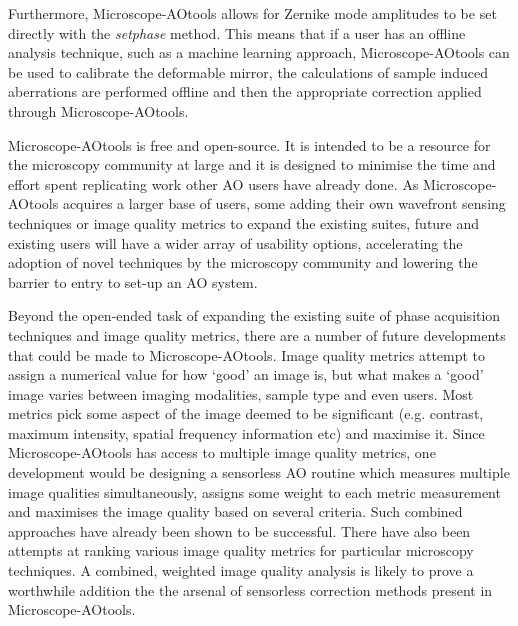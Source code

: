 Furthermore, Microscope-AOtools allows for Zernike mode amplitudes to be 
set directly with the \textit{set\textunderscore phase} method. This means 
that if a user has an offline analysis technique, such as a machine 
learning approach, Microscope-AOtools can be used to calibrate the 
deformable mirror, the calculations of sample induced aberrations are 
performed offline and then the appropriate correction applied through 
Microscope-AOtools.

Microscope-AOtools is free and open-source. It is intended to be a resource 
for the microscopy community at large and it is designed to minimise the 
time and effort spent replicating work other AO users have already done. As 
Microscope-AOtools acquires a larger base of users, some adding their own 
wavefront sensing techniques or image quality metrics to expand the 
existing suites, future and existing users will have a wider array of 
usability options, accelerating the adoption of novel techniques by the 
microscopy community and lowering the barrier to entry to set-up an AO 
system.

Beyond the open-ended task of expanding the existing suite of phase 
acquisition techniques and image quality metrics, there are a number of 
future developments that could be made to Microscope-AOtools. Image 
quality metrics attempt to assign a numerical value for how `good' an 
image is, but what makes a `good' image varies between imaging 
modalities, sample type and even users. Most metrics pick some aspect of 
the image deemed to be significant (e.g. contrast, maximum intensity, 
spatial frequency information etc) and maximise it. Since 
Microscope-AOtools has access to multiple image quality metrics, one 
development would be designing a sensorless AO routine which measures 
multiple image qualities simultaneously, assigns some weight to each 
metric measurement and maximises the image quality based on several 
criteria. Such combined approaches have already been shown to be 
successful\cite{gould2012adaptive}. There have also been attempts at 
ranking various image quality metrics for particular microscopy 
techniques\cite{koho2016image}. A combined, weighted image quality 
analysis is likely to prove a worthwhile addition the the arsenal of 
sensorless correction methods present in Microscope-AOtools.

